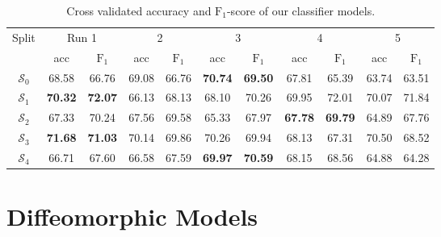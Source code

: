 \begin{table}[h]
	\begin{center}
		\begin{tabular}{c c c c c c c c c c c}
			\toprule
			\multirow{2}{*}{Split} & 
			\multicolumn{2}{c}{Run 1} & 
			\multicolumn{2}{c}{2} & 
			\multicolumn{2}{c}{3} & 
			\multicolumn{2}{c}{4} & 
			\multicolumn{2}{c}{5} \\
			\cmidrule(lr){2-3}
			\cmidrule(lr){4-5}
			\cmidrule(lr){6-7}
			\cmidrule(lr){8-9}
			\cmidrule(lr){10-11}
			 & acc & $\text{F}_1$ & acc & $\text{F}_1$ & acc & $\text{F}_1$ & acc & $\text{F}_1$ & acc & $\text{F}_1$ \\ 
			\cmidrule(lr){1-11}
			$\mathcal{S}_0$ & 68.58 & 66.76 & 69.08 & 66.76 & \textbf{70.74} & \textbf{69.50} & 67.81 & 65.39 & 63.74 & 63.51 \\
			$\mathcal{S}_1$ & \textbf{70.32} & \textbf{72.07} & 66.13 & 68.13 & 68.10 & 70.26 & 69.95 & 72.01 & 70.07 & 71.84 \\
			$\mathcal{S}_2$ & 67.33 & 70.24 & 67.56 & 69.58 & 65.33 & 67.97 & \textbf{67.78} & \textbf{69.79} & 64.89 & 67.76 \\
			$\mathcal{S}_3$ & \textbf{71.68} & \textbf{71.03} & 70.14 & 69.86 & 70.26 & 69.94 & 68.13 & 67.31 & 70.50 & 68.52 \\
			$\mathcal{S}_4$ & 66.71 & 67.60 & 66.58 & 67.59 & \textbf{69.97} & \textbf{70.59} & 68.15 & 68.56 & 64.88 & 64.28 \\
			\bottomrule
		\end{tabular}
		\caption{Cross validated accuracy and $\text{F}_1$-score of our classifier models.}
		\label{tab:clfcrossval}
	\end{center}
\end{table} %

\section{Diffeomorphic Models}

